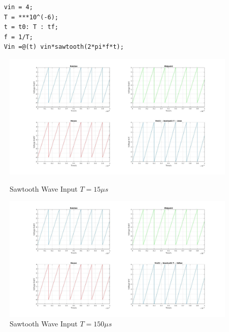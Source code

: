 \documentclass[11pt,a4paper]{article}
\begin{document}
\begin{verbatim}
    vin = 4;
    T = ***10^(-6);
    t = t0: T : tf;
    f = 1/T;
    Vin =@(t) vin*sawtooth(2*pi*f*t);
\end{verbatim}
\begin{figure}[h]
	\vspace{-5mm}
	\centering
	\includegraphics[width=\textwidth]{Ex1_Figs/saw15.jpg}
	\vspace{-6mm}
	\caption{Sawtooth Wave Input $T = 15 \mu s$}
	\label{fig:RL13}
	\includegraphics[width=\textwidth]{Ex1_Figs/saw150.jpg}
	\vspace{-3mm}
	\caption{Sawtooth Wave Input $T = 150 \mu s$}
	\label{fig:RL14}
\end{figure}

\pagebreak
\end{document}
